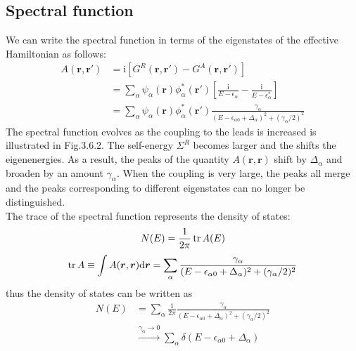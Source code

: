 \documentclass[11pt,a4paper]{book}
\theoremstyle{plain}
\theoremstyle{definition}
\theoremstyle{remark}
\newcommand{\ii}{\mathrm{i}}                      %
\renewcommand{\vec}[1]{\boldsymbol{#1}}
\begin{document}
\subsection{Spectral function}
We can write the spectral function in terms of the eigenstates of the effective Hamiltonian as follows:
\begin{equation}
    \begin{aligned}
        A(\vec{r}, \vec{r}') & = \ii \left[G^R(\vec{r}, \vec{r}') - G^A(\vec{r}, \vec{r}') \right] \\
        & = \sum_\alpha \psi_\alpha(\vec{r}) \phi_\alpha^*(\vec{r}') \left[ \frac{\ii}{E - \epsilon_\alpha} - \frac{\ii}{E - \epsilon_\alpha^*} \right] \\
        & = \sum_\alpha \psi_\alpha(\vec{r}) \phi_\alpha^*(\vec{r}') \frac{\gamma_\alpha}{(E - \epsilon_{\alpha 0} + \Delta_\alpha)^2 + (\gamma_\alpha/2)^2}
    \end{aligned}
\end{equation}
The spectral function evolves as the coupling to the leads is increased is illustrated in Fig.3.6.2. The self-energy $\Sigma^R$ becomes larger and the shifts the eigenenergies. As a result, the peaks of the quantity $A(\vec{r}, \vec{r})$ shift by $\Delta_\alpha$ and broaden by an amount $\gamma_\alpha$. When the coupling is very large, the peaks all merge and the peaks corresponding to different eigenstates can no longer be distinguished. \\
The trace of the spectral function represents the density of states:
\begin{equation}
    N(E) = \frac{1}{2 \pi} \trace{A(E)}
\end{equation}
\begin{equation}
    \trace{A} \equiv \int A(\vec{r}, \vec{r}) \dd \vec{r} = \sum_\alpha \frac{\gamma_\alpha}{(E - \epsilon_{\alpha 0} + \Delta_\alpha)^2 + (\gamma_\alpha/2)^2}
\end{equation}
thus the density of states can be written as 
\begin{equation}
    \begin{aligned}
    N(E) & = \sum_\alpha \frac{1}{2 \pi} \frac{\gamma_\alpha}{(E - \epsilon_{\alpha 0} + \Delta_\alpha)^2 + (\gamma_\alpha/2)^2} \\
    & \xrightarrow{\gamma_\alpha \to 0} \sum_\alpha \delta(E - \epsilon_{\alpha 0} + \Delta_\alpha)
    \end{aligned}
\end{equation} 
\end{document}
